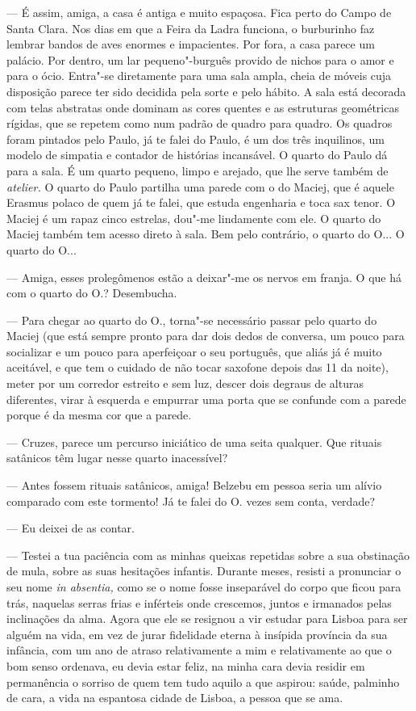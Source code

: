 --- É assim, amiga, a casa é antiga e muito espaçosa. Fica perto do Campo de
Santa Clara. Nos dias em que a
Feira da Ladra funciona, o burburinho faz lembrar bandos de aves enormes
e impacientes. Por fora, a casa parece um palácio. Por dentro, um lar
pequeno"-burguês provido de nichos para o amor e para o ócio. Entra"-se
diretamente para uma sala ampla, cheia de móveis cuja disposição parece
ter sido decidida pela sorte e pelo hábito. A sala está decorada com
telas abstratas onde dominam as cores quentes e as estruturas geométricas rígidas, que se repetem como num padrão de quadro para quadro.
Os quadros foram pintados pelo Paulo, já te falei do Paulo, é um dos
três inquilinos, um modelo de simpatia e contador de histórias
incansável. O quarto do Paulo dá para a sala. É um quarto pequeno, limpo
e arejado, que lhe serve também de \emph{atelier. }O quarto do Paulo
partilha uma parede com o do Maciej, que é aquele Erasmus polaco de quem
já te falei, que estuda engenharia e toca sax tenor. O Maciej é um rapaz
cinco estrelas, dou"-me lindamente com ele. O quarto do Maciej também tem
acesso direto à sala. Bem pelo contrário, o quarto do O... O quarto do
O...

--- Amiga, esses prolegômenos estão a deixar"-me os nervos em franja. O que
  há com o quarto do O.? Desembucha.

--- Para chegar ao quarto do O., torna"-se necessário passar pelo quarto do
  Maciej (que está sempre pronto para dar dois dedos de conversa, um
  pouco para socializar e um pouco para aperfeiçoar o seu português, que
  aliás já é muito aceitável, e que tem o cuidado de não tocar saxofone
  depois das 11 da noite), meter por um corredor estreito e sem luz,
  descer dois degraus de alturas diferentes, virar à esquerda e empurrar
  uma porta que se confunde com a parede porque é da mesma cor que a
  parede.

--- Cruzes, parece um percurso iniciático de uma seita qualquer. Que
  rituais satânicos têm lugar nesse quarto inacessível?

--- Antes fossem rituais satânicos, amiga! Belzebu em pessoa seria um
  alívio comparado com este tormento! Já te falei do O. vezes sem conta,
  verdade?

--- Eu deixei de as contar.

--- Testei a tua paciência com as minhas queixas repetidas sobre a sua
  obstinação de mula, sobre as suas hesitações infantis. Durante meses,
  resisti a pronunciar o seu nome \emph{in absentia, }como se o nome
  fosse inseparável do corpo que ficou para trás, naquelas serras
  frias e inférteis onde crescemos, juntos e irmanados pelas inclinações
  da alma. Agora que ele se resignou a vir estudar para Lisboa para ser
  alguém na vida, em vez de jurar fidelidade eterna à insípida província
  da sua infância, com um ano de atraso relativamente a mim e relativamente ao que o bom senso ordenava, eu devia estar feliz, na minha
  cara devia residir em permanência o sorriso de quem tem tudo aquilo a
  que aspirou: saúde, palminho de cara, a vida na espantosa cidade de
  Lisboa, a pessoa que se ama.


